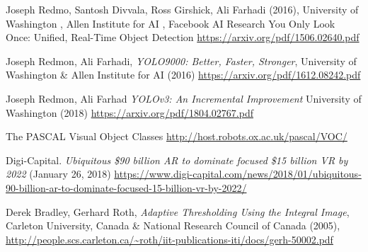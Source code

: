 \begin{thebibliography}{X}
Joseph Redmo, Santosh Divvala, Ross Girshick, Ali Farhadi (2016), University of Washington
, Allen Institute for AI
, Facebook AI Research
You Only Look Once: Unified, Real-Time Object Detection
\url{https://arxiv.org/pdf/1506.02640.pdf} 

Joseph Redmon, Ali Farhadi, \textit{YOLO9000:
Better, Faster, Stronger}, 
University of Washington \& Allen Institute for AI (2016)
\url{https://arxiv.org/pdf/1612.08242.pdf}

Joseph Redmon, Ali Farhad
\textit{YOLOv3: An Incremental Improvement}
University of Washington (2018)
\url{https://arxiv.org/pdf/1804.02767.pdf}

The PASCAL Visual Object Classes
\url{http://host.robots.ox.ac.uk/pascal/VOC/}

Digi-Capital. \textit{Ubiquitous  \$90 billion AR to dominate focused \$15 billion VR by 2022}
(January 26, 2018)
\url{https://www.digi-capital.com/news/2018/01/ubiquitous-90-billion-ar-to-dominate-focused-15-billion-vr-by-2022/}

Derek Bradley, Gerhard Roth, \textit{Adaptive Thresholding Using the Integral Image},
Carleton University, Canada \& National Research Council of Canada (2005), 
\url{http://people.scs.carleton.ca/~roth/iit-publications-iti/docs/gerh-50002.pdf}

\end{thebibliography}
